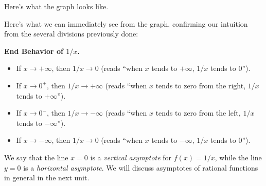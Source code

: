 \documentclass{ximera}
\begin{document}
Here's what the graph looks like.


\begin{image}
\end{image}





Here's what we can immediately see from the graph, confirming our intuition from the several divisions previously done:

\begin{callout}
  {\bf End Behavior of $1/x$.}
  \begin{itemize}
  \item If $x \to +\infty$, then $1/x \to 0$ (reads ``when $x$ tends to $+\infty$, $1/x$ tends to $0$'').
  \item If $x \to 0^+$, then $1/x \to +\infty$ (reads ``when $x$ tends to zero from the right, $1/x$ tends to $+\infty$'').
  \item If $x \to 0^-$, then $1/x \to -\infty$ (reads ``when $x$ tends to zero from the left, $1/x$ tends to $-\infty$'').
  \item If $x \to -\infty$, then $1/x \to 0$ (reads ``when $x$ tends to $-\infty$, $1/x$ tends to $0$'').
  \end{itemize}
\end{callout}

We say that the line $x=0$ is a \emph{vertical asymptote} for $f(x) = 1/x$, while the line $y=0$ is a \emph{horizontal asymptote}. We will discuss asymptotes of rational functions in general in the next unit. 

\begin{image}
\end{image}
\end{document}
